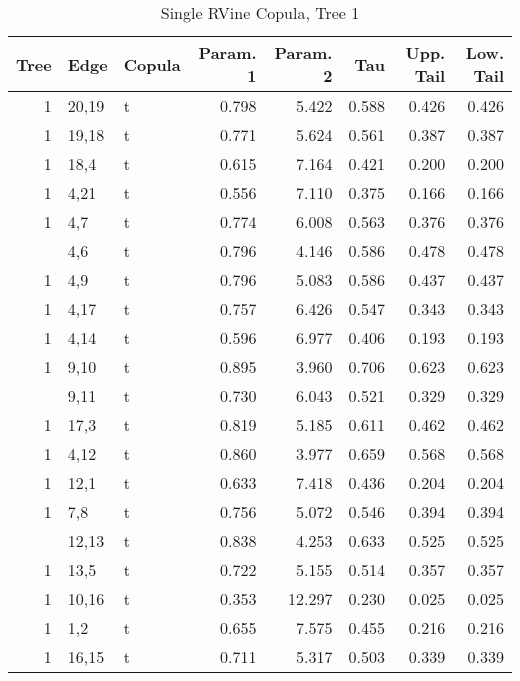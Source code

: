 \begin{table}

\caption{Single RVine Copula, Tree 1}
\centering
\begin{tabular}[t]{rllrrrrr}
\toprule
Tree & Edge & Copula & Param. 1 & Param. 2 & Tau & Upp. Tail & Low. Tail\\
\midrule
1 & 20,19 & t & 0.798 & 5.422 & 0.588 & 0.426 & 0.426\\
1 & 19,18 & t & 0.771 & 5.624 & 0.561 & 0.387 & 0.387\\
1 & 18,4 & t & 0.615 & 7.164 & 0.421 & 0.200 & 0.200\\
1 & 4,21 & t & 0.556 & 7.110 & 0.375 & 0.166 & 0.166\\
1 & 4,7 & t & 0.774 & 6.008 & 0.563 & 0.376 & 0.376\\
\addlinespace
1 & 4,6 & t & 0.796 & 4.146 & 0.586 & 0.478 & 0.478\\
1 & 4,9 & t & 0.796 & 5.083 & 0.586 & 0.437 & 0.437\\
1 & 4,17 & t & 0.757 & 6.426 & 0.547 & 0.343 & 0.343\\
1 & 4,14 & t & 0.596 & 6.977 & 0.406 & 0.193 & 0.193\\
1 & 9,10 & t & 0.895 & 3.960 & 0.706 & 0.623 & 0.623\\
\addlinespace
1 & 9,11 & t & 0.730 & 6.043 & 0.521 & 0.329 & 0.329\\
1 & 17,3 & t & 0.819 & 5.185 & 0.611 & 0.462 & 0.462\\
1 & 4,12 & t & 0.860 & 3.977 & 0.659 & 0.568 & 0.568\\
1 & 12,1 & t & 0.633 & 7.418 & 0.436 & 0.204 & 0.204\\
1 & 7,8 & t & 0.756 & 5.072 & 0.546 & 0.394 & 0.394\\
\addlinespace
1 & 12,13 & t & 0.838 & 4.253 & 0.633 & 0.525 & 0.525\\
1 & 13,5 & t & 0.722 & 5.155 & 0.514 & 0.357 & 0.357\\
1 & 10,16 & t & 0.353 & 12.297 & 0.230 & 0.025 & 0.025\\
1 & 1,2 & t & 0.655 & 7.575 & 0.455 & 0.216 & 0.216\\
1 & 16,15 & t & 0.711 & 5.317 & 0.503 & 0.339 & 0.339\\
\bottomrule
\end{tabular}
\end{table}
